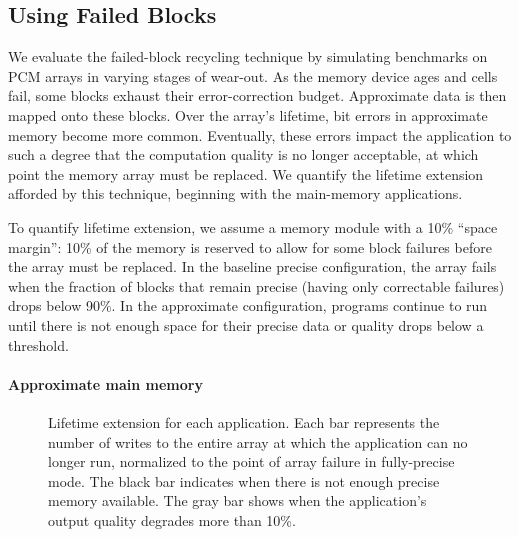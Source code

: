 \subsection{Using Failed Blocks}

We evaluate the failed-block recycling technique by simulating
benchmarks on PCM arrays in varying stages of wear-out. As the
memory device ages and cells fail, some blocks exhaust their
error-correction budget. Approximate data is then mapped onto these
blocks.
Over the array's lifetime,
bit errors in approximate memory
become more common. Eventually, these errors impact the application to such a
degree that the computation quality is no longer acceptable, at which point the
memory array must be replaced.
We quantify the
lifetime extension afforded by this technique, beginning with the
main-memory applications.

To quantify lifetime extension, we assume a memory module with a 10\% ``space
margin'': 10\% of the memory is reserved to allow for some block
failures before the array must be replaced. In the baseline precise
configuration, the array fails when the fraction of blocks that remain
precise (having only correctable failures) drops below 90\%. In the approximate
configuration, programs continue to run until there is not enough space for
their precise data or quality drops below a threshold.

\paragraph{Approximate main memory}

\begin{figure}
    \centering
    
    \caption{
        Lifetime extension for each application.
    Each bar represents the number of writes to the entire array at
    which the application can no longer run,
    normalized to the point of array failure in fully-precise mode.
    The black bar indicates when there is not enough precise
    memory available. The gray bar shows when the application's
    output quality degrades more than 10\%.
    }
    \label{approxstorage:fig:extension}
\end{figure}

